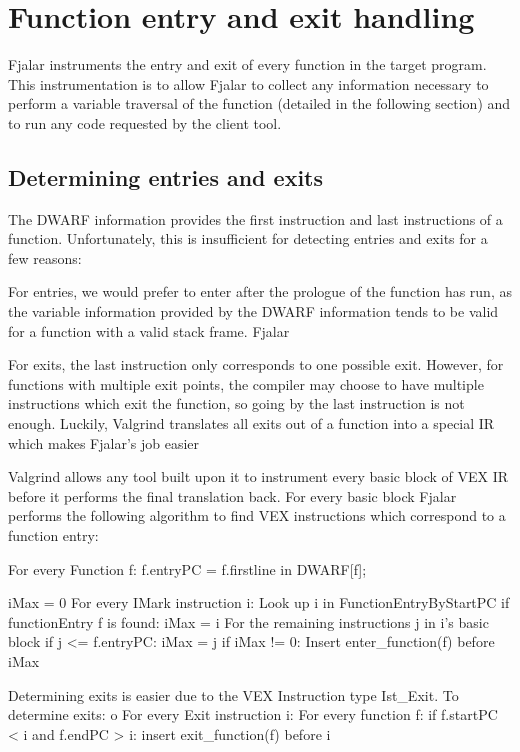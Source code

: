 \documentclass[11pt]{article}
\begin{document}



\section{Function entry and exit handling}
Fjalar instruments the entry and exit of every function in the target
program. This instrumentation is to allow Fjalar to collect any
information necessary to perform a variable traversal of the function
(detailed in the following section) and to run any code requested by
the client tool.


\subsection{Determining entries and exits}
The DWARF information provides the first instruction and last
instructions of a function. Unfortunately, this
is insufficient for detecting entries and exits for a few reasons:

For entries, we would prefer to enter after the prologue of the
function has run, as the variable information provided by the DWARF
information tends to be valid for a function with a valid stack frame.
Fjalar

For exits, the last instruction only corresponds to one possible
exit. However, for functions with multiple exit points, the compiler
may choose to have multiple instructions which exit the function, so
going by the last instruction is not enough. Luckily, Valgrind
translates all exits out of a function into a special IR which makes
Fjalar's job easier

Valgrind allows any tool built upon it to instrument every basic block
of VEX IR before it performs the final translation back. For every
basic block Fjalar performs the following algorithm to find VEX
instructions which correspond to a function entry:

\begin{program}
For every Function f:
  f.entryPC = f.firstline in DWARF[f];

iMax = 0
For every IMark instruction i:
  Look up i in FunctionEntryByStartPC 
  if functionEntry f is found:
    iMax = i
    For the remaining instructions j in i's basic block
      if j <= f.entryPC: 
        iMax = j
if iMax != 0:
  Insert enter\_function(f) before iMax

Determining exits is easier due to the VEX Instruction type
Ist\_Exit. To determine exits:
o
For every Exit instruction i:
  For every function f:
     if f.startPC < i and f.endPC > i:
        insert exit\_function(f) before i
\end{program}
\end{document}
